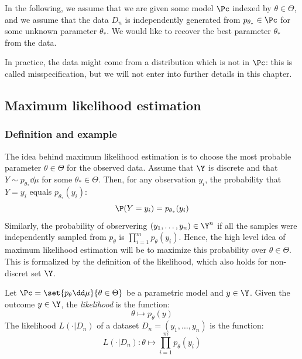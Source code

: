 \documentclass[toc, titlepaged]{../cs-classes/cs-classes}
\begin{document}
In the following, we assume that we are given some model $\Pc$ indexed by $\theta\in\Theta$, and we assume that the data $D_n$ is independently generated from $p_{\theta_*}\in\Pc$ for some unknown parameter $\theta_*$. We would like to recover the best parameter $\theta_*$ from the data. 

\begin{remark}
    In practice, the data might come from a distribution which is not in $\Pc$: this is called misspecification, but we will not enter into further details in this chapter.
\end{remark}

\subsection{Maximum likelihood estimation}
\subsubsection{Definition and example}
The idea behind maximum likelihood estimation is to choose the most probable parameter $\theta\in\Theta$ for the observed data. Assume that $\Y$ is discrete and that $Y\sim p_{\theta_*}\dd\mu$ for some $\theta_*\in\Theta$. Then, for any observation $y_i$, the probability that $Y=y_i$ equals $p_{\theta_*}(y_i)$:
\begin{equation*}
    \P(Y=y_i) = p_{\theta_*}(y_i)
\end{equation*}
Similarly, the probability of observering $(y_1, \dots, y_n)\in\Y^n$ if all the samples were independently sampled from $p_\theta$ is $\prod_{i=1}^m p_\theta(y_i)$. Hence, the high level idea of maximum likelihood estimation will be to maximize this probability over $\theta\in\Theta$. This is formalized by the definition of the likelihood, which also holds for non-discret set $\Y$.

\begin{definition}[Likelihood]
    Let $\Pc = \set{p_\theta\dd\mu}{\theta\in\Theta}$ be a parametric model and $y\in\Y$. Given the outcome $y\in\Y$, the \emph{likelihood} is the function:
    \begin{equation}
        \theta \longmapsto p_\theta(y)
    \end{equation}
    The likelihood $L(\cdot|D_n)$ of a dataset $D_n=(y_1, \dots, y_n)$ is the function:
    \begin{equation}
        L(\cdot|D_n) : \theta \longmapsto \prod_{i=1}^m p_\theta(y_i)
    \end{equation}
\end{definition}
\end{document}

